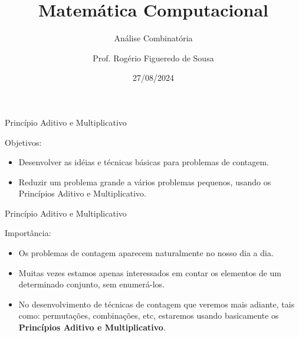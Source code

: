 \documentclass[aspectratio=169]{beamer}
\title{Matemática Computacional}
\subtitle{Análise Combinatória}
\author{Prof. Rogério Figueredo de Sousa}
\institute{%
\href{rogerio.sousa@ifpi.edu.br}{rogerio.sousa@ifpi.edu.br}%
}%
\date{27/08/2024}
\begin{document}
\begin{frame}[plain]
    \titlepage
\end{frame}




\jsonp
{}

\begin{frame}{Princípio Aditivo e Multiplicativo}

    Objetivos:

    \vspace{4mm}
    \begin{itemize}
        \item Desenvolver as idéias e técnicas básicas para problemas de contagem.
        \item Reduzir um problema grande a vários problemas pequenos, usando os Princípios Aditivo e Multiplicativo.
    \end{itemize}

\end{frame}

\begin{frame}{Princípio Aditivo e Multiplicativo}

    Importância:

    \vspace{4mm}
    \begin{itemize}
        \item Os problemas de contagem aparecem naturalmente no nosso dia a dia.
        \item Muitas vezes estamos apenas interessados em contar os elementos de um determinado conjunto, sem enumerá-los.
        \item No desenvolvimento de técnicas de contagem que veremos mais adiante, tais como: permutações, combinações, etc, estaremos usando basicamente os \textbf{Princípios Aditivo e Multiplicativo}.
    \end{itemize}

\end{frame}
\end{document}
